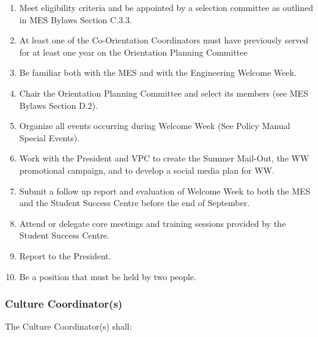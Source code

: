 \begin{enumerate}
 \item
  Meet eligibility criteria and be appointed by a selection committee as
  outlined in MES Bylaws Section C.3.3.
 \item
  At least one of the Co-Orientation Coordinators must have previously
  served for at least one year on the Orientation Planning Committee
 \item
  Be familiar both with the MES and with the Engineering Welcome Week.
 \item
  Chair the Orientation Planning Committee and select its members (see
  MES Bylaws Section D.2).
 \item
  Organize all events occurring during Welcome Week (See Policy Manual
  Special Events).
 \item
  Work with the President and VPC to create the Summer Mail-Out, the WW
  promotional campaign, and to develop a social media plan for WW.
 \item
  Submit a follow up report and evaluation of Welcome Week to both the
  MES and the Student Success Centre before the end of September.
 \item
  Attend or delegate core meetings and training sessions provided by the
  Student Success Centre.
 \item
  Report to the President.
 \item
  Be a position that must be held by two people.

\end{enumerate}
\hypertarget{culture-coordinators}{%
 \subsubsection{Culture Coordinator(s)}
 \label{culture-coordinators}}

The Culture Coordinator(s) shall:


